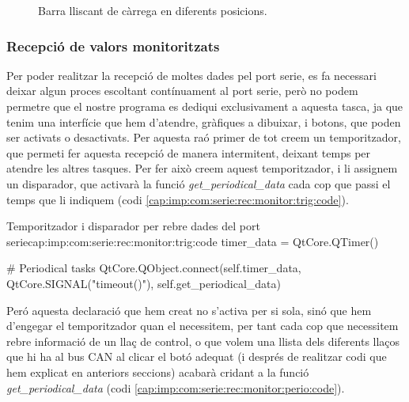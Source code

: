 \begin{figure}[ht!]
	
	

	\caption{Barra lliscant de càrrega en diferents posicions.}
    \label{fig:comparacio:barra}
\end{figure}

\FloatBarrier

\subsubsection{Recepció de valors monitoritzats}\label{cap:imp:com:serie:rec:monitor}

Per poder realitzar la recepció de moltes dades pel port serie, es fa necessari deixar algun proces escoltant contínuament al port serie, però no podem permetre que el nostre programa es dediqui exclusivament a aquesta tasca, ja que tenim una interfície que hem d'atendre, gràfiques a dibuixar, i botons, que poden ser activats o desactivats. Per aquesta raó primer de tot creem un temporitzador, que permeti fer aquesta recepció de manera intermitent, deixant temps per atendre les altres tasques. Per fer això creem aquest temporitzador, i li assignem un disparador, que activarà la funció \emph{get\_periodical\_data} cada cop que passi el temps que li indiquem (codi \ref{cap:imp:com:serie:rec:monitor:trig:code}).

\begin{code_python}{Temporitzador i disparador per rebre dades del port serie}{cap:imp:com:serie:rec:monitor:trig:code}
timer_data = QtCore.QTimer()
    
# Periodical tasks
QtCore.QObject.connect(self.timer_data, QtCore.SIGNAL("timeout()"), self.get_periodical_data)
\end{code_python}

Peró aquesta declaració que hem creat no s'activa per si sola, sinó que hem d'engegar el temporitzador quan el necessitem, per tant cada cop que necessitem rebre informació de un llaç de control, o que volem una llista dels diferents llaços que hi ha al bus CAN al clicar el botó adequat (i després de realitzar codi que hem explicat en anteriors seccions) acabarà cridant a la funció \emph{get\_periodical\_data} (codi \ref{cap:imp:com:serie:rec:monitor:perio:code}).

